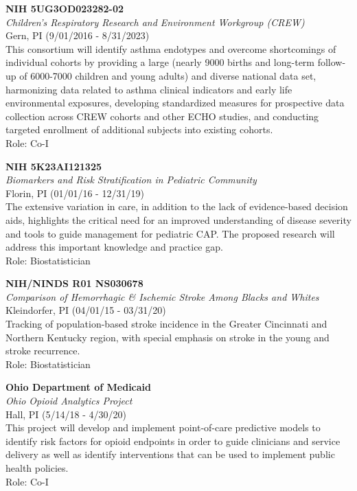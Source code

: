 \documentclass{nihbiosketch}
\begin{document}
\bigskip

\textbf{NIH 5UG3OD023282-02}\\
\emph{Children's Respiratory Research and Environment Workgroup
	(CREW)}\\
Gern, PI (9/01/2016 - 8/31/2023)\\
This consortium will identify asthma endotypes and overcome shortcomings
of individual cohorts by providing a large (nearly 9000 births and
long-term follow-up of 6000-7000 children and young adults) and diverse
national data set, harmonizing data related to asthma clinical
indicators and early life environmental exposures, developing
standardized measures for prospective data collection across CREW
cohorts and other ECHO studies, and conducting targeted enrollment of
additional subjects into existing cohorts.\\
Role: Co-I

\bigskip

\textbf{NIH 5K23AI121325}\\
\emph{Biomarkers and Risk Stratification in Pediatric Community}\\
Florin, PI (01/01/16 - 12/31/19)\\
The extensive variation in care, in addition to the lack of
evidence-based decision aids, highlights the critical need for an
improved understanding of disease severity and tools to guide management
for pediatric CAP. The proposed research will address this important
knowledge and practice gap.\\
Role: Biostatistician

\bigskip

\textbf{NIH/NINDS R01 NS030678}\\
\emph{Comparison of Hemorrhagic \& Ischemic Stroke Among Blacks and
	Whites}\\
Kleindorfer, PI (04/01/15 - 03/31/20)\\
Tracking of population-based stroke incidence in the Greater Cincinnati
and Northern Kentucky region, with special emphasis on stroke in the
young and stroke recurrence.\\
Role: Biostatistician

\bigskip

\textbf{Ohio Department of Medicaid}\\
\emph{Ohio Opioid Analytics Project}\\
Hall, PI (5/14/18 - 4/30/20)\\
This project will develop and implement point-of-care predictive models
to identify risk factors for opioid endpoints in order to guide
clinicians and service delivery as well as identify interventions that
can be used to implement public health policies.\\
Role: Co-I
\end{document}
